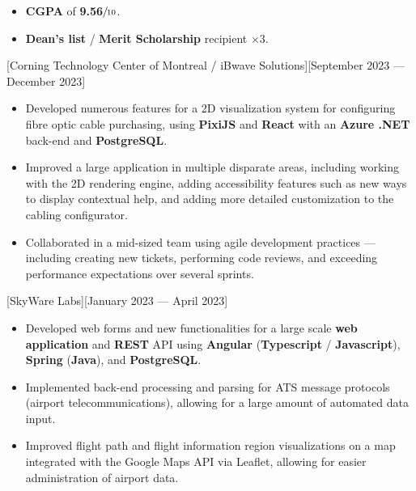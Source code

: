 \documentclass{article}
\begin{document}
\begin{itemize}
	\item \textbf{CGPA} of \textbf{9.56}\(\sfrac{}{10}\).
	\item \textbf{Dean's list} / \textbf{Merit Scholarship} recipient
	      \(\times\)3.
\end{itemize}

\vspace*{\fill}


[Corning Technology Center of Montreal /
	iBwave Solutions][September 2023 --- December 2023]

\begin{itemize}
	\item Developed numerous features for a 2D visualization system for
	      configuring fibre optic cable purchasing, using \textbf{PixiJS} and
	      \textbf{React} with an \textbf{Azure .NET} back-end and
	      \textbf{PostgreSQL}.
	\item Improved a large application in multiple disparate areas, including
	      working with the 2D rendering engine, adding accessibility features
	      such as new ways to display contextual help, and adding more detailed
	      customization to the cabling configurator.
	\item Collaborated in a mid-sized team using agile development practices ---
	      including creating new tickets, performing code reviews, and exceeding
	      performance expectations over several sprints.
\end{itemize}

[SkyWare Labs][January 2023 --- April 2023]

\begin{itemize}
	\item Developed web forms and new functionalities for a large scale
	      \textbf{web application} and \textbf{REST} API using
	      \textbf{Angular} (\textbf{Typescript} / \textbf{Javascript}),
	      \textbf{Spring} (\textbf{Java}), and \textbf{PostgreSQL}.
	\item Implemented back-end processing and parsing for ATS message protocols
	      (airport telecommunications), allowing for a large amount of automated
	      data input.
	\item Improved flight path and flight information region visualizations on a
	      map integrated with the Google Maps API via Leaflet, allowing for
	      easier administration of airport data.
\end{itemize}
\end{document}
